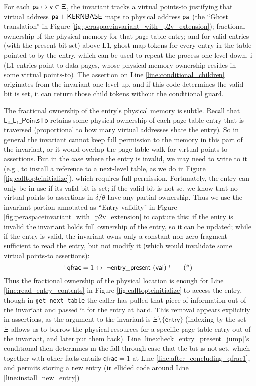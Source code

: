 For each $\textsf{pa}\mapsto \textsf{v} \in\Xi$, the invariant tracks a virtual points-to justifying that virtual address $\textsf{pa}+\textsf{KERNBASE}$ maps to physical address $\textsf{pa}$
(the ``Ghost translation'' in Figure \ref{fig:peraspaceinvariant_with_p2v_extension});
fractional ownership of the physical memory for that page table entry;
and for valid entries (with the present bit set) above L1, ghost map tokens for every entry in the table pointed to by the entry, which can be used
to repeat the process one level down. i
(L1 entries point to data pages, whose physical memory ownership resides in some virtual points-to).
The assertion on Line \ref{line:conditional_children} originates from the invariant one level up, and if this code determines the valid bit is set,
it can return those child tokens without the conditional guard.

The fractional ownership of the entry's physical memory is subtle. Recall that $\textsf{L}_{4}\_\textsf{L}_{1}\_\textsf{PointsTo}$ retains some physical
ownership of each page table entry that is traversed (proportional to how many virtual addresses share the entry).
So in general the invariant cannot keep full permission to the memory in this part of the invariant, or it would overlap the page table walk for virtual points-to
assertions. But in the case where the entry is invalid, we may need to write to it (e.g., to install a reference to a next-level table, as we do in Figure \ref{fig:calltopteinitialize}),
which requires full permission. Fortunately, the entry can only be in use if its valid bit is set; if the valid bit is not set we know
that no virtual points-to assertions in $\delta$/$\theta$ have any partial ownership.
Thus we use the invariant portion annotated as ``Entry validity'' in Figure \ref{fig:peraspaceinvariant_with_p2v_extension} to capture this:
if the entry is invalid the invariant holds full ownership of the entry, so it can be updated; while if the entry is valid,
the invariant owns only a constant non-zero fragment sufficient to read the entry, but not modify it (which would invalidate some virtual points-to assertions):
\begin{equation*}
 \ulcorner \textsf{qfrac} = 1 \leftrightarrow \; \lnot\textsf{entry\_present }(\textsf{val}) \urcorner \tag{*}
\end{equation*}
Thus the fractional ownership of the physical location is enough for Line \ref{line:read_entry_contents} in Figure \ref{fig:calltopteinitialize} to access the entry, though in \lstinline|get_next_table|
the caller has pulled that piece of information out of the invariant and passed it for the entry at hand.
This removal appears explicitly in assertions,
as the argument to the invariant is $\Xi\setminus\{\mathsf{entry}\}$ (indexing by the set $\Xi$ allows us to borrow the physical resources
for a specific page table entry out of the invariant, and later put them back).
Line \ref{line:check_entry_present_jump}'s conditional then determines in the fall-through case that the bit is not set, which 
together with other facts entails $\textsf{qfrac} = 1$ at Line \ref{line:after_concluding_qfrac1},
and permits storing a new entry (in ellided code around Line \ref{line:install_new_entry})

